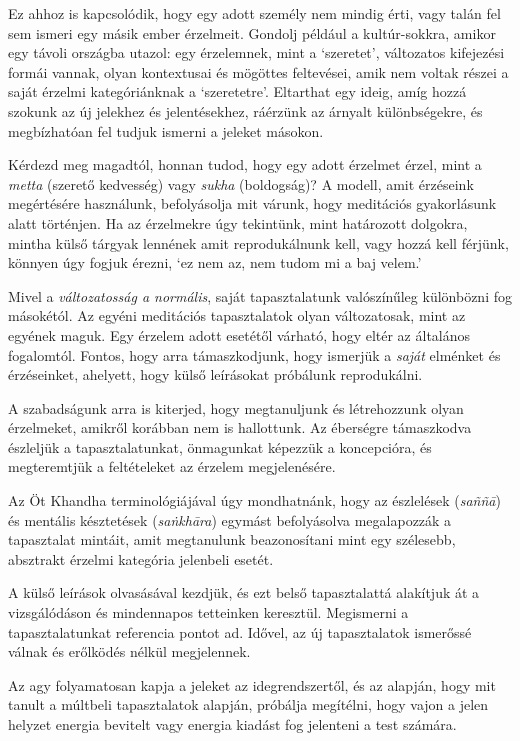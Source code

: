 Ez ahhoz is kapcsolódik, hogy egy adott személy nem mindig érti, vagy
talán fel sem ismeri egy másik ember érzelmeit. Gondolj például a
kultúr-sokkra, amikor egy távoli országba utazol: egy érzelemnek, mint a
`szeretet', változatos kifejezési formái vannak, olyan kontextusai és
mögöttes feltevései, amik nem voltak részei a saját érzelmi
kategóriánknak a `szeretetre'. Eltarthat egy ideig, amíg hozzá szokunk
az új jelekhez és jelentésekhez, ráérzünk az árnyalt különbségekre, és
megbízhatóan fel tudjuk ismerni a jeleket másokon.

Kérdezd meg magadtól, honnan tudod, hogy egy adott érzelmet érzel, mint
a \emph{metta} (szerető kedvesség) vagy \emph{sukha} (boldogság)? A
modell, amit érzéseink megértésére használunk, befolyásolja mit várunk,
hogy meditációs gyakorlásunk alatt történjen. Ha az érzelmekre úgy
tekintünk, mint határozott dolgokra, mintha külső tárgyak lennének amit
reprodukálnunk kell, vagy hozzá kell férjünk, könnyen úgy fogjuk érezni,
`ez nem az, nem tudom mi a baj velem.'

Mivel a \emph{változatosság a normális}, saját tapasztalatunk
valószínűleg különbözni fog másokétól. Az egyéni meditációs
tapasztalatok olyan változatosak, mint az egyének maguk. Egy érzelem
adott esetétől várható, hogy eltér az általános fogalomtól. Fontos, hogy
arra támaszkodjunk, hogy ismerjük a \emph{saját} elménket és
érzéseinket, ahelyett, hogy külső leírásokat próbálunk reprodukálni.

A szabadságunk arra is kiterjed, hogy megtanuljunk és létrehozzunk olyan
érzelmeket, amikről korábban nem is hallottunk. Az éberségre támaszkodva
észleljük a tapasztalatunkat, önmagunkat képezzük a koncepcióra, és
megteremtjük a feltételeket az érzelem megjelenésére.

Az Öt Khandha terminológiájával úgy mondhatnánk, hogy az észlelések
(\emph{saññā}) és mentális késztetések (\emph{saṅkhāra}) egymást
befolyásolva megalapozzák a tapasztalat mintáit, amit megtanulunk
beazonosítani mint egy szélesebb, absztrakt érzelmi kategória jelenbeli
esetét.

A külső leírások olvasásával kezdjük, és ezt belső tapasztalattá
alakítjuk át a vizsgálódáson és mindennapos tetteinken keresztül.
Megismerni a tapasztalatunkat referencia pontot ad. Idővel, az új
tapasztalatok ismerőssé válnak és erőlködés nélkül megjelennek.


Az agy folyamatosan kapja a jeleket az idegrendszertől, és az alapján,
hogy mit tanult a múltbeli tapasztalatok alapján, próbálja megítélni,
hogy vajon a jelen helyzet energia bevitelt vagy energia kiadást fog
jelenteni a test számára.

